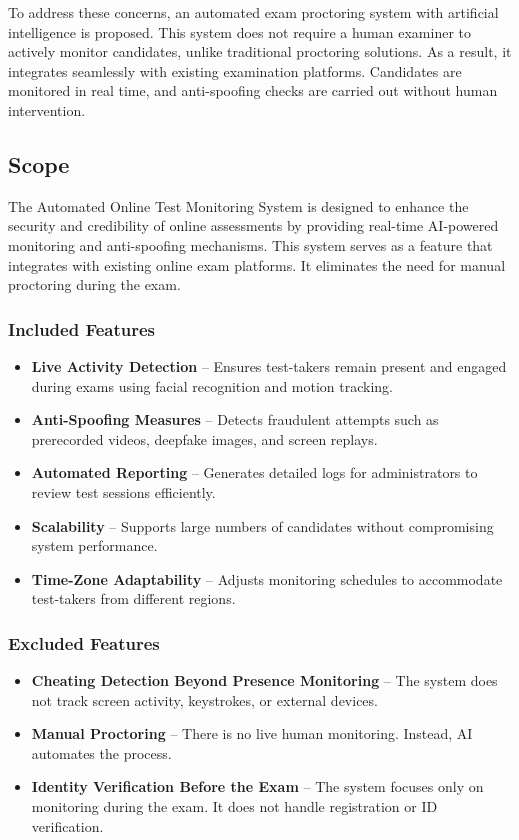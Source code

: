 \documentclass[12pt,a4paper]{article}
\begin{document}
To address these concerns, an automated exam proctoring system with artificial intelligence is proposed. This system does not require a human examiner to actively monitor candidates, unlike traditional proctoring solutions. As a result, it integrates seamlessly with existing examination platforms. Candidates are monitored in real time, and anti-spoofing checks are carried out without human intervention.

\subsection{Scope}

The Automated Online Test Monitoring System is designed to enhance the security and credibility of online assessments by providing real-time AI-powered monitoring and anti-spoofing mechanisms. This system serves as a feature that integrates with existing online exam platforms. It eliminates the need for manual proctoring during the exam.

\subsubsection{Included Features}

\begin{itemize}
    \item \textbf{Live Activity Detection} – Ensures test-takers remain present and engaged during exams using facial recognition and motion tracking.
    \item \textbf{Anti-Spoofing Measures} – Detects fraudulent attempts such as prerecorded videos, deepfake images, and screen replays.
    \item \textbf{Automated Reporting} – Generates detailed logs for administrators to review test sessions efficiently.
    \item \textbf{Scalability} – Supports large numbers of candidates without compromising system performance.
    \item \textbf{Time-Zone Adaptability} – Adjusts monitoring schedules to accommodate test-takers from different regions.
\end{itemize}

\subsubsection{Excluded Features}

\begin{itemize}
    \item \textbf{Cheating Detection Beyond Presence Monitoring} – The system does not track screen activity, keystrokes, or external devices.
    \item \textbf{Manual Proctoring} – There is no live human monitoring. Instead, AI automates the process.
    \item \textbf{Identity Verification Before the Exam} – The system focuses only on monitoring during the exam. It does not handle registration or ID verification.
\end{itemize}
\end{document}
